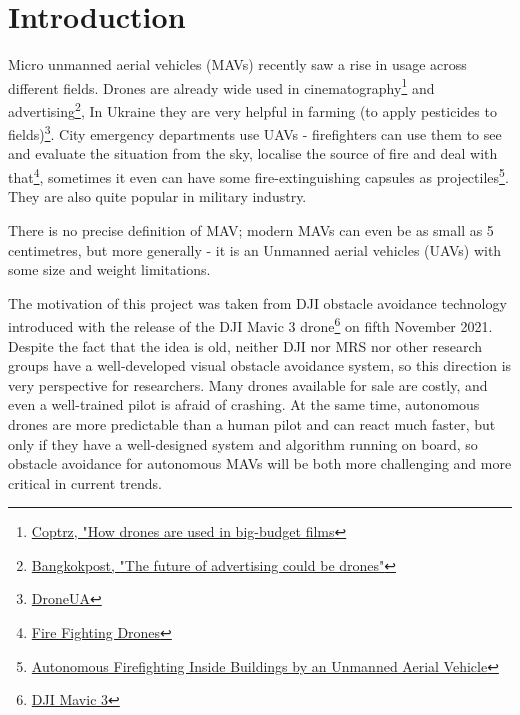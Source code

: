 \chapter{Introduction}
\label{chapter:intro}

Micro unmanned aerial vehicles (MAVs) recently saw a rise in usage across different fields. Drones are already wide used in cinematography\footnote{\href{https://coptrz.com/drones-in-filmmaking-the-best-drones-for-the-job/\#:~:text=How\%20drones\%20are\%20used\%20in\%20big\%2Dbudget\%20films}{Coptrz, "How drones are used in big-budget films}} and advertising\footnote{\href{https://www.bangkokpost.com/business/2124327/the-future-of-advertising-could-be-drones\#:~:text=However\%2C\%20using\%20drones\%20is\%20a,automobile\%20shows\%20and\%20other\%20campaigns.}{Bangkokpost, "The future of advertising could be drones"}}, In Ukraine they are very helpful in farming (to apply pesticides to fields)\footnote{\href{https://techukraine.org/portfolio/droneua-solution-of-field-cultivation-by-drones-up-to-1-million-hectares-in-ukraine/\#:~:text=Since\%202019\%2C\%20spraying\%20drones\%20began,not\%20depend\%20on\%20soil\%20moisture.}{DroneUA}}. City emergency departments use UAVs  - firefighters can use them to see and evaluate the situation from the sky, localise the source of fire and deal with that\footnote{\href{https://www.dslrpros.com/firefighting-drones.html}{Fire Fighting Drones}}, sometimes it even can have some fire-extinguishing capsules as projectiles\footnote{\href{https://ieeexplore.ieee.org/stamp/stamp.jsp?arnumber=9328798}{Autonomous Firefighting Inside Buildings by an Unmanned Aerial Vehicle}}. They are also quite popular in military industry.

There is no precise definition of MAV; modern MAVs can even be as small as 5 centimetres, but more generally - it is an Unmanned aerial vehicles (UAVs) with some size and weight limitations.

The motivation of this project was taken from DJI obstacle avoidance technology introduced with the release of the DJI Mavic 3 drone\footnote{\href{https://www.dji.com/cz/mavic-3}{DJI Mavic 3}} on fifth November 2021. Despite the fact that the idea is old, neither DJI nor MRS nor other research groups have a well-developed visual obstacle avoidance system, so this direction is very perspective for researchers. Many drones available for sale are costly, and even a well-trained pilot is afraid of crashing. At the same time, autonomous drones are more predictable than a human pilot and can react much faster, but only if they have a well-designed system and algorithm running on board, so obstacle avoidance for autonomous MAVs will be both more challenging and more critical in current trends.

